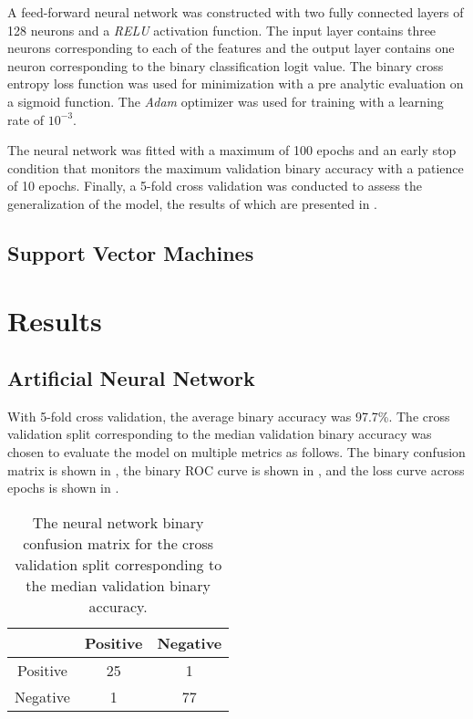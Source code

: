 \documentclass[twocolumn]{article}
\begin{document}
A feed-forward neural network was constructed with two fully connected layers of
128 neurons and a \emph{RELU} activation function. The input layer contains
three neurons corresponding to each of the features and the output layer
contains one neuron corresponding to the binary classification logit value. The
binary cross entropy loss function was used for minimization with a pre analytic
evaluation on a sigmoid function. The \emph{Adam} optimizer was used for
training with a learning rate of $10^{-3}$.

The neural network was fitted with a maximum of 100 epochs and an early stop
condition that monitors the maximum validation binary accuracy with a patience
of 10 epochs. Finally, a 5-fold cross validation was conducted to assess the
generalization of the model, the results of which are presented in
.

\subsection{Support Vector Machines}

\section{Results}
\label{sec:Results}

\subsection{Artificial Neural Network}

With 5-fold cross validation, the average binary accuracy was 97.7\%. The
cross validation split corresponding to the median validation binary accuracy
was chosen to evaluate the model on multiple metrics as follows. The binary
confusion matrix is shown in , the binary
ROC curve is shown in , and the loss curve across
epochs is shown in .

\begin{table}
\begin{center}
\begin{tabular}{ccc}
\toprule
& Positive & Negative \\
\midrule
Positive & 25 & 1 \\
Negative & 1 & 77 \\
\bottomrule
\end{tabular}
\end{center}
\caption{The neural network binary confusion matrix for the cross validation
  split corresponding to the median validation binary accuracy.}
\label{tab:NeuralNetworkConfusionMatrix}
\end{table}
\end{document}
